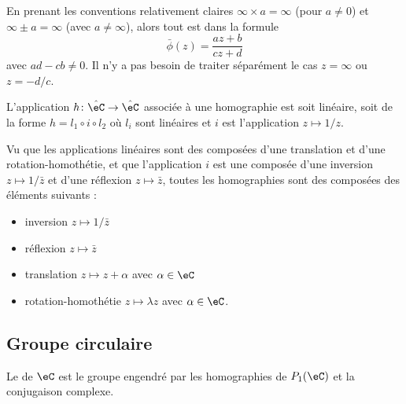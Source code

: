 \begin{remark}
    En prenant les conventions relativement claires \( \infty\times a=\infty\) (pour \( a\neq 0\)) et \( \infty\pm a=\infty\) (avec \( a\neq \infty\)), alors tout est dans la formule
    \begin{equation}
        \bar\phi(z)=\frac{ az+b }{ cz+d }
    \end{equation}
    avec \( ad-cb\neq 0\). Il n'y a pas besoin de traiter séparément le cas \( z=\infty\) ou \( z=-d/c\).
\end{remark}

\begin{proposition}
    L'application \( h\colon \hat\eC\to \hat \eC\) associée à une homographie est soit linéaire, soit de la forme \( h=l_1\circ i\circ l_2\) où \( l_i\) sont linéaires et \( i\) est l'application \( z\mapsto 1/z\).
\end{proposition}

\begin{normaltext}
    Vu que les applications linéaires sont des composées d'une translation et d'une rotation-homothétie, et que l'application \( i\) est une composée d'une inversion \( z\mapsto 1/\bar z\) et d'une réflexion \( z\mapsto \bar z\), toutes les homographies sont des composées des éléments suivants :
    \begin{itemize}
        \item inversion \( z\mapsto 1/\bar z\)
        \item réflexion \( z\mapsto \bar z\)
        \item translation \( z\mapsto z+\alpha\) avec \( \alpha\in \eC\)
        \item rotation-homothétie \( z\mapsto \lambda z\) avec \( \alpha\in \eC\).
    \end{itemize}
\end{normaltext}

\subsection{Groupe circulaire}

\begin{definition}
    Le  de \( \eC\) est le groupe engendré par les homographies de \( P_1(\eC)\) et la conjugaison complexe.
\end{definition}


